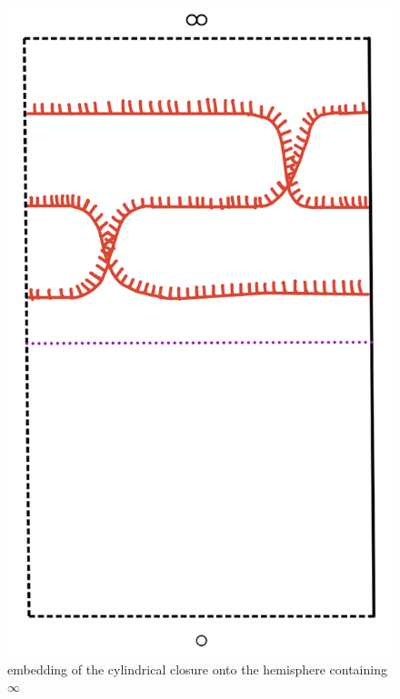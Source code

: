 \begin{figure}[H] %
    \centering
    \includegraphics[scale = 0.95]{diagrams/natural_alternating_diagrams/4-1.png} %
    \caption{embedding of the cylindrical closure onto the hemisphere containing $\infty$}
    \label{fig:your-label}
\end{figure}


